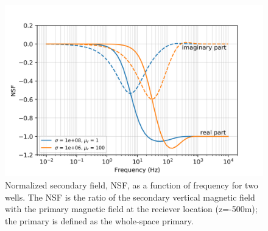 \begin{figure}[htb]
    \begin{center}
    \includegraphics[width=0.6\columnwidth]{figures/casing_software/fdemNSF.png}
    \end{center}
\caption{
    Normalized secondary field, NSF, as a function of frequency for two wells.
    The NSF is the ratio of the secondary vertical magnetic field with the primary magnetic field at the reciever location (z=-500m);
    the primary is defined as the whole-space primary.
}
\label{fig:fdemNSF}
\end{figure}
